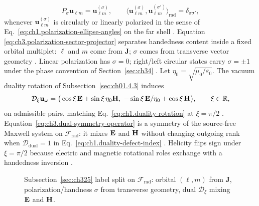 \begin{equation}
\label{eq:ch3.polarization-sector-projector}
P_{\sigma}
\mathbf{u}_{\ell m}
=
\mathbf{u}_{\ell m}^{(\sigma)},
\qquad
\langle \mathbf{u}_{\ell m}^{(\sigma)},\mathbf{u}_{\ell m}^{(\sigma')}\rangle_{\mathrm{rad}}
=
\delta_{\sigma\sigma'},
\end{equation}
whenever \(\mathbf{u}_{\ell m}^{(\sigma)}\) is circularly or linearly polarized in the sense of
Eq.~\eqref{eq:ch1.polarization-ellipse-angles} on the far shell \cite{stratton1941}. Equation
\eqref{eq:ch3.polarization-sector-projector} separates handedness content inside a fixed orbital multiplet:
\(\ell\) and \(m\) come from \(\mathbf{J}\); \(\sigma\) comes from transverse vector geometry
\cite{belinfante1940}. Linear polarization has \(\sigma=0\); right/left circular states carry
\(\sigma=\pm1\) under the phase convention of Section~\ref{sec:ch34} \cite{stratton1941}.
Let \(\eta_0=\sqrt{\mu_0/\varepsilon_0}\). The vacuum duality rotation of Subsection~\ref{sec:ch01.4.3} induces
\begin{equation}
\label{eq:ch3.dual-symmetry-operator}
\mathcal{D}_{\xi}\mathbf{u}_\omega
=
\big(\cos\xi\,\mathbf{E}+\sin\xi\,\eta_0\mathbf{H},\
-\sin\xi\,\mathbf{E}/\eta_0+\cos\xi\,\mathbf{H}\big),
\qquad
\xi\in\mathbb{R},
\end{equation}
on admissible pairs, matching Eq.~\eqref{eq:ch1.duality-rotation} at \(\xi=\pi/2\)
\cite{stratton1941}. Equation~\eqref{eq:ch3.dual-symmetry-operator} is a symmetry of the
source-free Maxwell system on \(\mathcal{F}_{\mathrm{rad}}\): it mixes \(\mathbf{E}\) and \(\mathbf{H}\) without changing
outgoing rank when \(\mathcal{D}_{\mathrm{dual}}=1\) in Eq.~\eqref{eq:ch1.duality-defect-index}
\cite{stratton1941}. Helicity flips sign under \(\xi=\pi/2\) because electric and magnetic rotational roles
exchange with a handedness inversion \cite{belinfante1940}.
\begin{figure}[t]
\centering
{}
\caption{Subsection~\ref{sec:ch325} label split on \(\mathcal{F}_{\mathrm{rad}}\): orbital \((\ell,m)\) from
\(\mathbf{J}\), polarization/handness \(\sigma\) from transverse geometry, dual \(\mathcal{D}_{\xi}\) mixing
\(\mathbf{E}\) and \(\mathbf{H}\).}
\label{fig:ch3.helicity-polarization-dual-split}
\end{figure}

